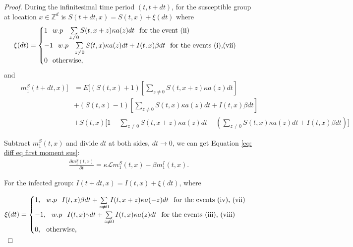 \documentclass[sn-basic]{sn-jnl}%
\theoremstyle{thmstyleone}%
\theoremstyle{thmstyletwo}%
\theoremstyle{thmstylethree}%
\numberwithin{equation}{theorem}
\begin{document}
\begin{proof} During the infinitesimal time period $(t,t+dt)$, for the susceptible group at location $x \in \mathbb{Z}^{d}$ is $S(t+dt,x)= S(t,x) + \xi (dt)$ where\\ 
$$\xi(dt) = \begin{cases}
        1 \hspace{.25cm} w.p \hspace{.25cm} \sum\limits_{z \neq 0}S(t, x+z) \kappa a(z) dt \hspace{.25cm} \text{for the event (ii)}\\
        -1 \hspace{.25cm} w.p \hspace{.25cm} \sum\limits_{z \neq 0}S(t, x) \kappa a(z) dt + I(t,x) \beta dt \hspace{.25cm} \text{for the events (i),(vii)}\\
        0 \hspace{.25cm} \text{otherwise,}
    \end{cases}$$
and    
\begin{align*}
    \qquad m_{1}^{S}(t+dt,x)]&= E \Big[(S(t,x)+1)[\sum\limits_{z \neq 0}S(t, x+z) \kappa a(z) dt]\\ 
    &+ (S(t,x)-1) [\sum\limits_{z \neq 0}S(t, x) \kappa a(z) dt+ I(t,x) \beta dt] \\
    &+ S(t,x)[1- \sum\limits_{z \neq 0}S(t, x+z) \kappa a(z) dt- (\sum\limits_{z \neq 0}S(t, x) \kappa a(z) dt + I(t,x) \beta dt)\Big]
\end{align*}

Subtract $m_1^S(t,x)$ and divide $dt$ at both sides, $dt\rightarrow 0$, we can get Equation \eqref{eq: diff eq first moment sus}:
\begin{align*}
    \displaystyle \frac{\partial m_{1}^{S}(t,x)}{\partial t} = \kappa \mathcal{L} m_{1}^{S}(t,x) - \beta m_{1}^{I}(t,x).
\end{align*}

For the infected group: $I(t+dt,x)= I(t,x) + \xi (dt)$, where

 $\xi (dt)= \begin{cases}
        1, \hspace{.25cm} w.p \hspace{.25cm} I(t,x) \beta dt + \sum\limits_{z \neq 0}I(t, x+z) \kappa a(-z) dt \hspace{.25cm} \text{for the events (iv), (vii)}\\
        -1, \hspace{.25cm} w.p \hspace{.25cm} I(t,x) \gamma dt + \sum\limits_{z \neq 0}I(t, x) \kappa a(z) dt \hspace{.25cm} \text{for the events (iii), (viii)}\\
        0, \hspace{.25cm} \text{otherwise,}
    \end{cases}$


\end{proof}
\end{document}
